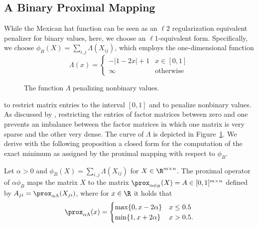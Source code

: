 \subsection{A Binary Proximal Mapping}\label{sec:PT:binprox}
While the Mexican hat function can be seen as an $\ell2$ regularization equivalent penalizer for binary values, here, we choose an $\ell1$-equivalent form.
Specifically, we choose $\phi_B(X)=\sum_{i,j}\Lambda(X_{ij})$, which employs the one-dimensional function 
\[
	\Lambda(x) = 
    \begin{cases}
        -|1-2x|+1 &x\in[0,1]\\
        \infty &\text{otherwise}
    \end{cases}
\]
\begin{figure}
\centering

\caption{The function $\Lambda$ penalizing nonbinary values.}
\label{fig:lambda}
\end{figure}
to restrict matrix entries to the interval $[0,1]$ and to penalize nonbinary values. As discussed by \cite{zhang2010binary}, restricting the entries of factor matrices between zero and one prevents an imbalance between the factor matrices in which one matrix is very sparse and the other very dense. The curve of $\Lambda$ is depicted  in Figure~\ref{fig:lambda}. 
We derive with the following proposition a closed form for the computation of the exact minimum as assigned by the proximal mapping with respect to $\phi_B$. 
\begin{theorem}
Let $\alpha>0$ and $\phi_B(X)=\sum_{i,j}\Lambda(X_{ij})$ for $X\in\R^{m\times n}$. The proximal operator of $\alpha\phi_B$ maps the matrix $X$ to the matrix $\prox_{\alpha\phi_B}(X)=A\in [0,1]^{m\times n}$ defined by $A_{ji}=\prox_{\alpha\Lambda}(X_{ji})$, where for $x\in \R$ it holds that
    \begin{equation}\label{eq:binprox}
	\prox_{\alpha \Lambda}(x)=
    \begin{cases}
        \max\{0,x-2\alpha\} &x\leq0.5\\
        \min\{1,x+2\alpha\} &x>0.5.
    \end{cases}
    \end{equation}
\end{theorem}
